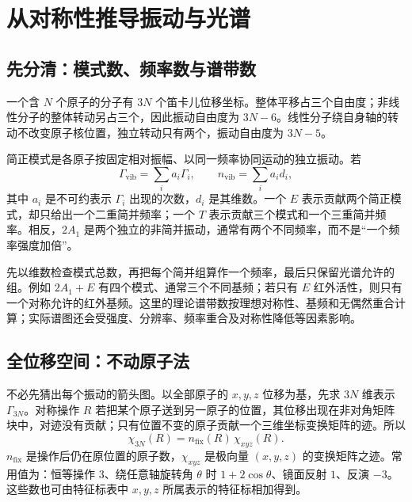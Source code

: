 \section{从对称性推导振动与光谱}
\label{sec:vibrational-applications}

\subsection{先分清：模式数、频率数与谱带数}

一个含 $N$ 个原子的分子有 $3N$ 个笛卡儿位移坐标。整体平移占三个自由度；非线性分子的整体转动另占三个，因此振动自由度为 $3N-6$。线性分子绕自身轴的转动不改变原子核位置，独立转动只有两个，振动自由度为 $3N-5$。

简正模式是各原子按固定相对振幅、以同一频率协同运动的独立振动。若
\[
\Gamma_{\mathrm{vib}}=\sum_i a_i\Gamma_i,
\qquad n_{\mathrm{vib}}=\sum_i a_i d_i,
\]
其中 $a_i$ 是不可约表示 $\Gamma_i$ 出现的次数，$d_i$ 是其维数。一个 $E$ 表示贡献两个简正模式，却只给出一个二重简并频率；一个 $T$ 表示贡献三个模式和一个三重简并频率。相反，$2A_1$ 是两个独立的非简并振动，通常有两个不同频率，而不是“一个频率强度加倍”。

\begin{keyidea}[数峰时的三个层次]
先以维数检查模式总数，再把每个简并组算作一个频率，最后只保留光谱允许的组。例如 $2A_1+E$ 有四个模式、通常三个不同基频；若只有 $E$ 红外活性，则只有一个对称允许的红外基频。这里的理论谱带数按理想对称性、基频和无偶然重合计算；实际谱图还会受强度、分辨率、频率重合及对称性降低等因素影响。
\end{keyidea}

\subsection{全位移空间：不动原子法}

不必先猜出每个振动的箭头图。以全部原子的 $x,y,z$ 位移为基，先求 $3N$ 维表示 $\Gamma_{3N}$。对称操作 $R$ 若把某个原子送到另一原子的位置，其位移出现在非对角矩阵块中，对迹没有贡献；只有位置不变的原子贡献一个三维坐标变换矩阵的迹。所以
\[
\chi_{3N}(R)=n_{\mathrm{fix}}(R)\,\chi_{xyz}(R).
\]
$n_{\mathrm{fix}}$ 是操作后仍在原位置的原子数，$\chi_{xyz}$ 是极向量 $(x,y,z)$ 的变换矩阵之迹。常用值为：恒等操作 $3$、绕任意轴旋转角 $\theta$ 时 $1+2\cos\theta$、镜面反射 $1$、反演 $-3$。这些数也可由特征标表中 $x,y,z$ 所属表示的特征标相加得到。

